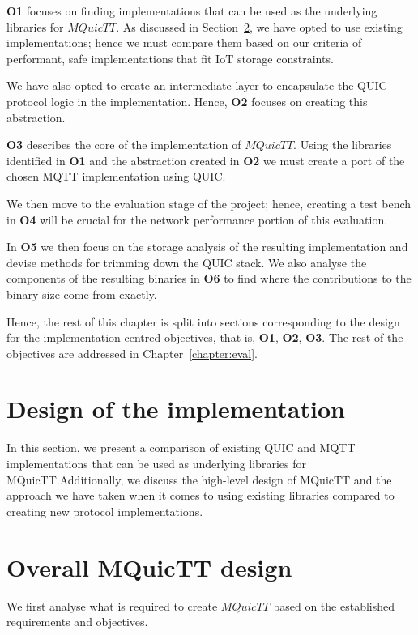 \textbf{O1} focuses on finding implementations that can be used as the underlying libraries for $MQuicTT$.
As discussed in Section~\ref{sec:mquictt_design}, we have opted to use existing implementations; hence we must compare them based on our criteria of performant, safe implementations that fit IoT storage constraints.

We have also opted to create an intermediate layer to encapsulate the QUIC protocol logic in the implementation.
Hence, \textbf{O2} focuses on creating this abstraction.

\textbf{O3} describes the core of the implementation of $MQuicTT$.
Using the libraries identified in \textbf{O1} and the abstraction created in \textbf{O2} we must create a port of the chosen MQTT implementation using QUIC.

We then move to the evaluation stage of the project; hence, creating a test bench in \textbf{O4} will be crucial for the network performance portion of this evaluation.

In \textbf{O5} we then focus on the storage analysis of the resulting implementation and devise methods for trimming down the QUIC stack.
We also analyse the components of the resulting binaries in \textbf{O6} to find where the contributions to the binary size come from exactly.

Hence, the rest of this chapter is split into sections corresponding to the design for the implementation centred objectives, that is, \textbf{O1}, \textbf{O2}, \textbf{O3}.
The rest of the objectives are addressed in Chapter~\ref{chapter:eval}.

\section{Design of the implementation}

In this section, we present a comparison of existing QUIC and MQTT implementations that can be used as underlying libraries for MQuicTT.Additionally, we discuss the high-level design of MQuicTT and the approach we have taken when it comes to using existing libraries compared to creating new protocol implementations.

\section{Overall MQuicTT design} \label{sec:mquictt_design}

We first analyse what is required to create $MQuicTT$ based on the established requirements and objectives.

